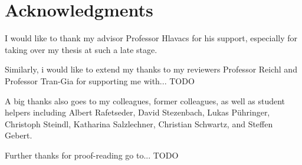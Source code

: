 \newpage %
\chapter*{Acknowledgments}

I would like to thank my advisor Professor Hlavacs for his support, especially for taking over my thesis at such a late stage.

Similarly, i would like to extend my thanks to my reviewers Professor Reichl and Professor Tran-Gia for supporting me with... TODO

A big thanks also goes to my colleagues, former colleagues, as well as student helpers including Albert Rafetseder, David Stezenbach, Lukas Pühringer, Christoph Steindl, Katharina Salzlechner, Christian Schwartz, and Steffen Gebert.

Further thanks for proof-reading go to... TODO

